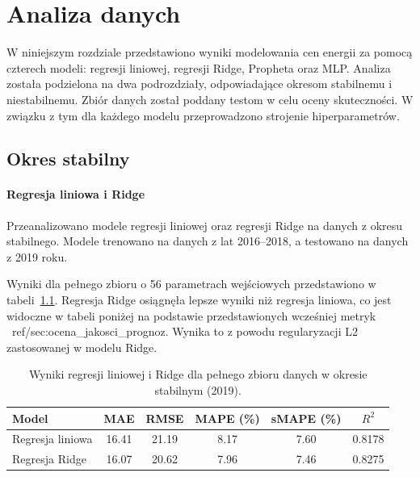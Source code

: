 \chapter{Analiza danych}
\label{ch:analiza}

W niniejszym rozdziale przedstawiono wyniki modelowania cen energii za pomocą czterech modeli: regresji liniowej, regresji Ridge, Propheta oraz MLP. Analiza została podzielona na dwa podrozdziały, odpowiadające okresom stabilnemu i niestabilnemu. Zbiór danych został poddany testom w celu oceny skuteczności. W związku z tym dla każdego modelu przeprowadzono strojenie hiperparametrów. 

\section{Okres stabilny}
\label{sec:okres_stabilny}

\subsubsection{Regresja liniowa i Ridge}

Przeanalizowano modele regresji liniowej oraz regresji Ridge na danych z okresu stabilnego. Modele trenowano na danych z lat 2016--2018, a testowano na danych z 2019 roku.

Wyniki dla pełnego zbioru o 56 parametrach wejściowych przedstawiono w tabeli~\ref{tab:linear_ridge_results_full}. Regresja Ridge osiągnęła lepsze wyniki niż regresja liniowa, co jest widoczne w tabeli poniżej na podstawie przedstawionych wcześniej metryk ~ref/{sec:ocena_jakosci_prognoz}. Wynika to z powodu regularyzacji L2 zastosowanej w modelu Ridge. 

\begin{table}[h]
    \centering
    \caption{Wyniki regresji liniowej i Ridge dla pełnego zbioru danych w okresie stabilnym (2019).}
    \label{tab:linear_ridge_results_full}
    \begin{tabular}{|l|ccccc|}
        \hline
        \textbf{Model} & \textbf{MAE} & \textbf{RMSE} & \textbf{MAPE (\%)} & \textbf{sMAPE (\%)} & \textbf{\(R^2\)} \\
        \hline
        Regresja liniowa & 16.41 & 21.19 & 8.17 & 7.60 & 0.8178 \\
        Regresja Ridge   & 16.07 & 20.62 & 7.96 & 7.46 & 0.8275 \\
        \hline
    \end{tabular}
\end{table}

